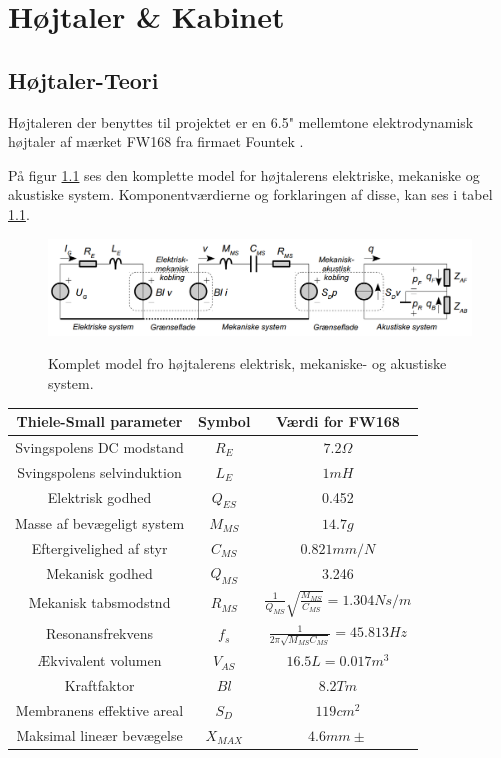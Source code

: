 \chapter{Højtaler \& Kabinet}

\section{Højtaler-Teori}
Højtaleren der benyttes til projektet er en 6.5" mellemtone elektrodynamisk højtaler af mærket FW168\cite{FW168} fra firmaet Fountek \cite{Fountek}. 

På figur \ref{fig:kompletmodel} ses den komplette model for højtalerens elektriske, mekaniske og akustiske system.\citep{Elektroakustik} Komponentværdierne og forklaringen af disse, kan ses i tabel \ref{tab:TS}.

\begin{figure}[H]
	\centering
	\includegraphics[width=\textwidth]{Pics/kompletmodel.PNG}
	\label{fig:kompletmodel}
	\caption{Komplet model fro højtalerens elektrisk, mekaniske- og akustiske system. } 
\end{figure}

\begin{table}
\centering
\begin{tabular}[C]{|c|c|c|}

	
\hline	
 \textbf{Thiele-Small parameter} & \textbf{Symbol} & \textbf{Værdi for FW168} \\\hline
 Svingspolens DC modstand & $R_E$ & $7.2\Omega$ \\\hline
 Svingspolens selvinduktion & $L_E$ & $1mH$  \\\hline
 Elektrisk godhed & $Q_{ES}$ & 0.452 \\\hline
 Masse af bevægeligt system & $M_{MS}$ & $14.7g$  \\\hline
 Eftergivelighed af styr & $C_{MS}$ & $0.821mm/N$  \\\hline
 Mekanisk godhed & $Q_{MS}$ & 3.246  \\\hline
 Mekanisk tabsmodstnd & $R_{MS}$ & \( \frac{1}{Q_{MS}}\sqrt{\frac{M_{MS}}{C_{MS}}}=1.304Ns/m \)  \\\hline
 Resonansfrekvens & $f_s$ & \( \frac{1}{2\pi\sqrt{M_{MS} C_{MS}}}=45.813Hz \) \\\hline
 
 
 Ækvivalent volumen & $ V_{AS} $ & $16.5L=0.017m^3$ \\\hline
 Kraftfaktor & $Bl$ & $8.2Tm$ \\\hline
 Membranens effektive areal & $S_D$ & $119cm^2$ \\\hline
 Maksimal lineær bevægelse & $X_{MAX}$ & $4.6mm\pm$ \\\hline
 
\end{tabular}
\label{tab:TS}
\end{table}

